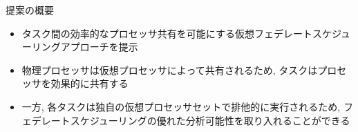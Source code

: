 
\begin{frame}{提案の概要}
    \begin{itemize}
        \item タスク間の効率的なプロセッサ共有を可能にする仮想フェデレートスケジューリングアプローチを提示
        \item 物理プロセッサは仮想プロセッサによって共有されるため, タスクはプロセッサを効果的に共有する
        \item 一方, 各タスクは独自の仮想プロセッサセットで排他的に実行されるため, フェデレートスケジューリングの優れた分析可能性を取り入れることができる
    \end{itemize}
\end{frame}
